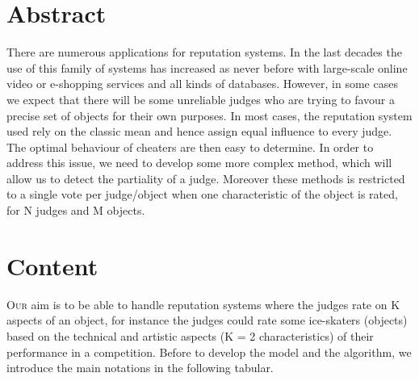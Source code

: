 \documentclass[9pt]{SelfArx} %
\begin{document}
\flushbottom %

\maketitle %

\thispagestyle{empty} %


\section*{Abstract}
There are numerous applications for reputation systems. In the last decades the use of this family of systems has increased as never before with large-scale online video or e-shopping services and all kinds of databases. However, in some cases we expect that there will be some unreliable judges who are trying to favour a precise set of objects for their own purposes. In most cases, the reputation system used rely on the classic mean and hence assign equal influence to every judge. The optimal behaviour of cheaters are then easy to determine. In order to address this issue, we need to develop some more complex method, which will allow us to detect the partiality of a judge. Moreover these methods is restricted to a single vote per judge/object when one characteristic of the object is rated, for N judges and M objects.

\section*{Content}

\lettrine[lines=2]{O}{ur} aim is to be able to handle reputation systems where the judges rate on K aspects of an object, for instance the judges could rate some ice-skaters (objects) based on the technical and artistic aspects (K = 2 characteristics) of their performance in a competition. Before to develop the model and the algorithm, we introduce the main notations in the following tabular.
\end{document}
